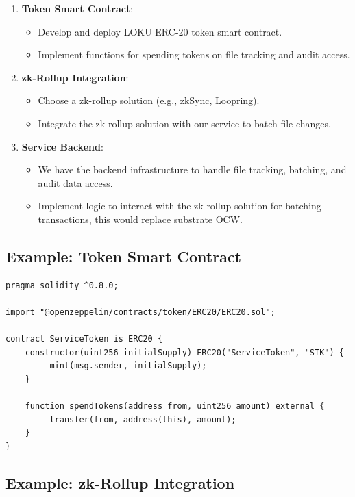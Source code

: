 \documentclass{tufte-handout}
\begin{document}
\begin{enumerate}
    \item \textbf{Token Smart Contract}:
    \begin{itemize}
        \item Develop and deploy LOKU ERC-20 token smart contract.
        \item Implement functions for spending tokens on file tracking and audit access.
    \end{itemize}
    \item \textbf{zk-Rollup Integration}:
    \begin{itemize}
        \item Choose a zk-rollup solution (e.g., zkSync, Loopring).
        \item Integrate the zk-rollup solution with our service to batch file changes.
    \end{itemize}
    \item \textbf{Service Backend}:
    \begin{itemize}
        \item We have the backend infrastructure to handle file tracking, batching, and audit data access.
        \item Implement logic to interact with the zk-rollup solution for batching transactions, this would replace substrate OCW.
    \end{itemize}
\end{enumerate}

\subsection*{Example: Token Smart Contract}

\begin{verbatim}
pragma solidity ^0.8.0;

import "@openzeppelin/contracts/token/ERC20/ERC20.sol";

contract ServiceToken is ERC20 {
    constructor(uint256 initialSupply) ERC20("ServiceToken", "STK") {
        _mint(msg.sender, initialSupply);
    }

    function spendTokens(address from, uint256 amount) external {
        _transfer(from, address(this), amount);
    }
}
\end{verbatim}

\subsection*{Example: zk-Rollup Integration}
\end{document}
